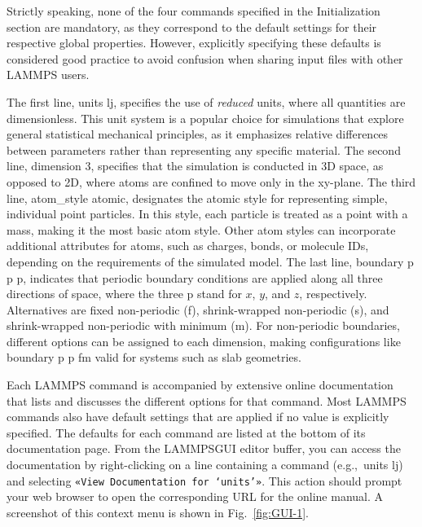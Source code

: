 \documentclass[9pt,tutorial]{livecoms}
\newcommand{\lmpcmd}[1]{\colorbox{listing}{\textcolor{command}{\small{#1}}}} %
\newcommand{\guicmd}[1]{\textcolor{command}{\texttt{«#1»}}} %
\newcommand{\lammpsgui}{\textsf{LAMMPS\textendash GUI}}
\begin{document}
\begin{note}
  Strictly speaking, none of the four commands specified in the
  Initialization section are mandatory, as they correspond to the
  default settings for their respective global properties.  However,
  explicitly specifying these defaults is considered good practice to
  avoid confusion when sharing input files with other LAMMPS users.
\end{note}

The first line, \lmpcmd{units lj}, specifies the use of \emph{reduced}
units, where all quantities are dimensionless.  This unit system is a
popular choice for simulations that explore general statistical
mechanical principles, as it emphasizes relative differences between
parameters rather than representing any specific material.  The second
line, \lmpcmd{dimension 3}, specifies that the simulation is conducted
in 3D space, as opposed to 2D, where atoms are confined to move only in
the xy-plane.  The third line, \lmpcmd{atom\_style atomic}, designates
the atomic style for representing simple, individual point particles.
In this style, each particle is treated as a point with a mass, making
it the most basic atom style.  Other atom styles can incorporate
additional attributes for atoms, such as charges, bonds, or molecule
IDs, depending on the requirements of the simulated model.  The last
line, \lmpcmd{boundary p p p}, indicates that periodic boundary
conditions are applied along all three directions of space, where the
three p stand for $x$, $y$, and $z$, respectively.  Alternatives are
fixed non-periodic (f), shrink-wrapped non-periodic (s), and
shrink-wrapped non-periodic with minimum (m).  For non-periodic
boundaries, different options can be assigned to each dimension, making
configurations like \lmpcmd{boundary p p fm} valid for systems such as
slab geometries.

\begin{note}
  Each LAMMPS command is accompanied by extensive online documentation
  that lists and discusses the different options for that
  command.  Most LAMMPS commands also have default settings
  that are applied if no value is explicitly specified.  The defaults
  for each command are listed at the bottom of its documentation
  page.  From the \lammpsgui{} editor buffer, you can access the
  documentation by right-clicking on a line containing a command
  (e.g.,~\lmpcmd{units lj}) and selecting \guicmd{View Documentation for
  `units'}.  This action should prompt your web browser to open the
  corresponding URL for the online manual.  A screenshot of this context
  menu is shown in Fig.~\ref{fig:GUI-1}.
\end{note}
\end{document}
